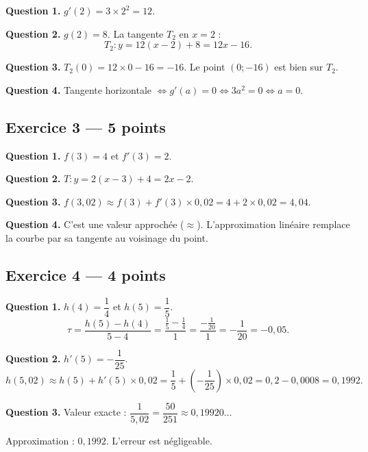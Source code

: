 \textbf{Question 1.}
$g'(2) = 3 \times 2^2 = 12.$

\textbf{Question 2.}
$g(2) = 8$. La tangente $T_2$ en $x=2$ :
\[
T_2 : y = 12(x-2) + 8 = 12x - 16.
\]

\textbf{Question 3.}
$T_2(0) = 12 \times 0 - 16 = -16$. Le point $(0;-16)$ est bien sur $T_2$. \checkmark

\textbf{Question 4.}
Tangente horizontale $\Leftrightarrow g'(a) = 0 \Leftrightarrow 3a^2 = 0 \Leftrightarrow a = 0$.

\subsection*{Exercice 3 — 5 points}


\textbf{Question 1.}
$f(3) = 4$ et $f'(3) = 2$.

\textbf{Question 2.}
$T : y = 2(x-3)+4 = 2x - 2.$

\textbf{Question 3.}
$f(3{,}02) \approx f(3) + f'(3) \times 0{,}02 = 4 + 2 \times 0{,}02 = 4{,}04.$

\textbf{Question 4.}
C'est une valeur approchée ($\approx$). L'approximation linéaire remplace la courbe par sa tangente au voisinage du point.

\subsection*{Exercice 4 — 4 points}


\textbf{Question 1.}
$h(4) = \dfrac{1}{4}$ et $h(5) = \dfrac{1}{5}$.
\[
\tau = \frac{h(5)-h(4)}{5-4} = \frac{\frac{1}{5}-\frac{1}{4}}{1} = \frac{-\frac{1}{20}}{1} = -\frac{1}{20} = -0{,}05.
\]

\textbf{Question 2.}
$h'(5) = -\dfrac{1}{25}$.
\[
h(5{,}02) \approx h(5) + h'(5) \times 0{,}02 = \frac{1}{5} + \left(-\frac{1}{25}\right) \times 0{,}02 = 0{,}2 - 0{,}0008 = 0{,}1992.
\]

\textbf{Question 3.}
Valeur exacte : $\dfrac{1}{5{,}02} = \dfrac{50}{251} \approx 0{,}19920\ldots$

Approximation : $0{,}1992$. L'erreur est négligeable.

